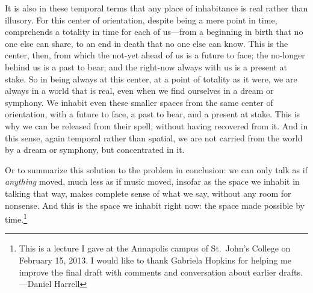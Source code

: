 \documentclass[12pt]{memoir}
\begin{document}
It is also in these temporal terms that any place of inhabitance is real
rather than illusory. For this center of orientation, despite being a
mere point in time, comprehends a totality in time for each of us---from
a beginning in birth that no one else can share, to an end in death that
no one else can know. This is the center, then, from which the not-yet
ahead of us is a future to face; the no-longer behind us is a past to
bear; and the right-now always with us is a present at stake. So in
being always at this center, at a point of totality as it were, we are
always in a world that is real, even when we find ourselves in a dream
or symphony. We inhabit even these smaller spaces from the same center
of orientation, with a future to face, a past to bear, and a present at
stake. This is why we can be released from their spell, without having
recovered from it. And in this sense, again temporal rather than
spatial, we are not carried from the world by a dream or symphony, but
concentrated in it.

Or to summarize this solution to the problem in conclusion: we can only
talk as if \emph{anything} moved, much less as if music moved, insofar
as the space we inhabit in talking that way, makes complete sense of
what we say, without any room for nonsense. And this is the space we
inhabit right now: the space made possible by time.\footnote{This is a
  lecture I gave at the Annapolis campus of St.~John's College on
  February 15, 2013. I would like to thank Gabriela Hopkins for helping
  me improve the final draft with comments and conversation about
  earlier drafts. ---Daniel Harrell}
  
  
\end{document}
